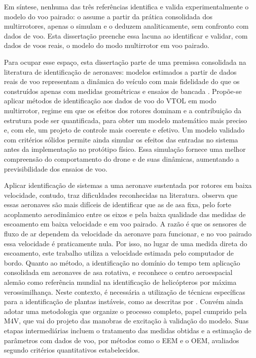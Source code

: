 {Em síntese, nenhuma das três referências identifica e valida experimentalmente o modelo do voo pairado: \textcite{Graesdal2021} o assume a partir da prática consolidada dos multirrotores, \textcite{Salahudden2023} apenas o simulam e \textcite{Nguyen2025} o deduzem analiticamente, sem confronto com dados de voo. Esta dissertação preenche essa lacuna ao identificar e validar, com dados de voos reais, o modelo do modo multirrotor em voo pairado.
}

{\color{blue}Para ocupar esse espaço,} esta dissertação parte de uma premissa consolidada na literatura de identificação de aeronaves: modelos estimados a partir de dados reais de voo representam a dinâmica do veículo com mais fidelidade do que os construídos apenas com medidas geométricas e ensaios de bancada \cite{Jategaonkar2015, Tischler2012}. Propõe-se aplicar métodos de identificação aos dados de voo do VTOL {\color{blue}em modo multirrotor, regime em que os efeitos dos rotores dominam e a contribuição da estrutura pode ser quantificada,} para obter um modelo matemático mais preciso e, com ele, um projeto de controle mais coerente e efetivo. Um modelo validado com critérios sólidos permite ainda simular os efeitos das entradas no sistema antes da implementação no protótipo físico. Essa simulação fornece uma melhor compreensão do comportamento do drone e de suas dinâmicas, aumentando a previsibilidade dos ensaios de voo.

{\color{blue}Aplicar identificação de sistemas a uma aeronave sustentada por rotores em baixa velocidade, contudo, traz dificuldades reconhecidas na literatura. \textcite{Jategaonkar2015} observa que essas aeronaves são mais difíceis de identificar que as de asa fixa, pelo forte acoplamento aerodinâmico entre os eixos e pela baixa qualidade das medidas de escoamento em baixa velocidade e em voo pairado. A razão é que os sensores de fluxo de ar dependem da velocidade da aeronave para funcionar, e no voo pairado essa velocidade é praticamente nula. Por isso, no lugar de uma medida direta do escoamento, este trabalho utiliza a velocidade estimada pelo computador de bordo. Quanto ao método, a identificação no domínio do tempo tem aplicação consolidada em aeronaves de asa rotativa, e \textcite{Tischler2012} reconhece o centro aeroespacial alemão como referência mundial na identificação de helicópteros por máxima verossimilhança.} Neste contexto, é necessária a utilização de técnicas específicas para a identificação de plantas instáveis, como as descritas por \textcite{Jategaonkar2015}. Convém ainda adotar uma metodologia que organize o processo completo, papel cumprido pela M4V, que vai do projeto das manobras de excitação à validação do modelo. Suas etapas intermediárias incluem o tratamento das medidas obtidas e a estimação de parâmetros com dados de voo, por métodos como o \gls{EEM} e o \gls{OEM}, avaliados segundo critérios quantitativos estabelecidos.

